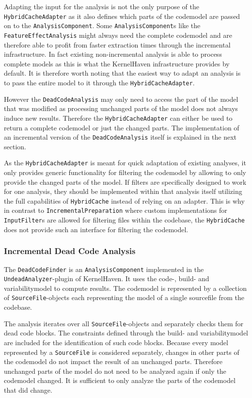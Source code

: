 \documentclass[a4paper]{article}
\begin{document}
Adapting the input for the analysis is not the only purpose of the \texttt{HybridCacheAdapter} as it also defines which parts of the codemodel are passed on to the \texttt{AnalysisComponent}. Some  \texttt{AnalysisComponent}s like the \texttt{FeatureEffectAnalysis} might always need the complete codemodel and are therefore able to profit from faster extraction times through the incremental infrastructure. In fact existing non-incremental analysis is able to process complete models as this is what the KernelHaven infrastructure provides by default. It is therefore worth noting that the easiest way to adapt an analysis  is to pass the entire model to it through the \texttt{HybridCacheAdapter}.

However the \texttt{DeadCodeAnalysis} may only need to access the part of the model that was modified as processing unchanged parts of the model does not always induce new results. Therefore the \texttt{HybridCacheAdapter} can either be used to return a complete codemodel or just the changed parts. The implementation of an incremental version of the \texttt{DeadCodeAnalysis} itself is explained in the next section.

As the \texttt{HybridCacheAdapter} is meant for quick adaptation of existing analyses, it only provides generic functionality for filtering the codemodel by allowing to only provide the changed parts of the model. If filters are specifically designed to work for one analysis, they should be implemented within that analysis itself utilizing the full capabilities of \texttt{HybridCache} instead of relying on an adapter. This is why in contrast to \texttt{IncrementalPreparation} where custom implementations for \texttt{InputFilter}s are allowed for filtering files within the codebase, the \texttt{HybridCache} does not provide such an interface for filtering the codemodel.

\subsubsection{Incremental Dead Code Analysis} \label{incremental-dead-code-analysis}

The \texttt{DeadCodeFinder} is an \texttt{AnalysisComponent} implemented in the \texttt{UndeadAnalyzer}-plugin of KernelHaven. It uses the code-, build- and variabilitymodel to compute results. The codemodel is represented by a collection of \texttt{SourceFile}-objects each representing the model of a single sourcefile from the codebase.

The analysis iterates over all \texttt{SourceFile}-objects and separately checks them for dead code blocks. The constraints defined through the build- and variabilitymodel are included for the identification of such code blocks. Because every model represented by a \texttt{SourceFile} is considered separately, changes in other parts of the codemodel do not impact the result of an unchanged parts. Therefore unchanged parts of the model do not need to be analyzed again if only the codemodel changed. It is sufficient to only analyze the parts of the codemodel that did change.
\end{document}
